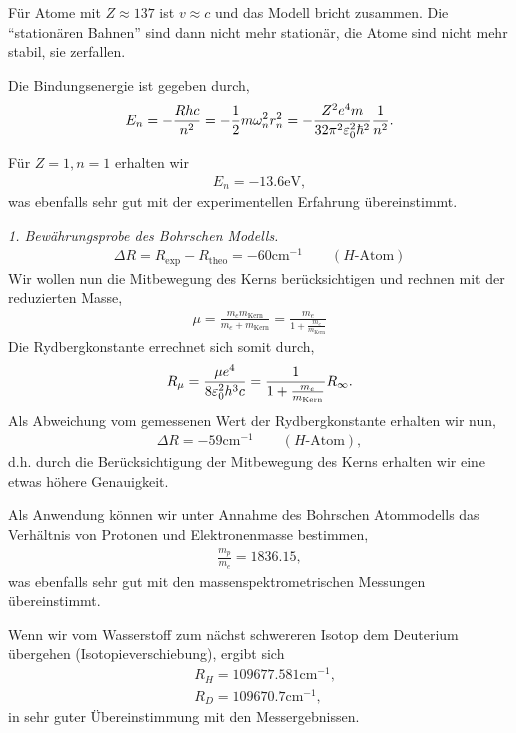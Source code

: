 Für Atome mit $Z\approx 137$ ist $v\approx c$ und das Modell bricht zusammen.
Die ``stationären Bahnen'' sind dann nicht mehr stationär, die Atome sind
nicht mehr stabil, sie zerfallen.

Die Bindungsenergie ist gegeben durch,
\begin{align*}
E_n = -\frac{Rhc}{n^2}= -\frac{1}{2}m\omega_n^2r_n^2 =
-\frac{Z^2e^4m}{32\pi^2\varepsilon_0^2\hbar^2}\frac{1}{n^2}.
\end{align*}

\begin{bspn}
Für $Z=1,n=1$ erhalten wir
\begin{align*}
E_n = -13.6\mathrm{eV},
\end{align*}
was ebenfalls sehr gut mit der experimentellen Erfahrung übereinstimmt.\bsphere
\end{bspn}

\textit{1. Bewährungsprobe des Bohrschen Modells.}
\begin{align*}
\Delta R = R_{\text{exp}}-R_{\text{theo}} = -60\mathrm{cm^{-1}}\qquad
(H\text{-Atom})
\end{align*}
Wir wollen nun die Mitbewegung des Kerns berücksichtigen und rechnen mit der
reduzierten Masse,
\begin{align*}
\mu = \frac{m_em_{\text{Kern}}}{m_e+m_{\text{Kern}}}
= \frac{m_e}{1+\frac{m_e}{m_{\text{Kern}}}}
\end{align*}
Die Rydbergkonstante errechnet sich somit durch,
\begin{align*}
R_\mu = \frac{\mu e^4}{8\varepsilon_0^2 h^3c} =
\frac{1}{1+\frac{m_e}{m_{\text{Kern}}}}R_\infty.
\end{align*}
Als Abweichung vom gemessenen Wert der Rydbergkonstante erhalten wir nun,
\begin{align*}
\Delta R = -59\mathrm{cm^{-1}}\qquad (H\text{-Atom}),
\end{align*}
d.h. durch die Berücksichtigung der Mitbewegung des Kerns erhalten wir eine
etwas höhere Genauigkeit.

Als Anwendung können wir unter Annahme des Bohrschen Atommodells 
das Verhältnis von Protonen und Elektronenmasse bestimmen,
\begin{align*}
\frac{m_p}{m_e} = 1836.15,
\end{align*}
was ebenfalls sehr gut mit den massenspektrometrischen Messungen übereinstimmt.

Wenn wir vom Wasserstoff zum nächst schwereren Isotop dem Deuterium übergehen
(Isotopieverschiebung), ergibt sich
\begin{align*}
&R_H = 109677.581\mathrm{cm^{-1}},\\
&R_D = 109670.7\mathrm{cm^{-1}},
\end{align*}
in sehr guter Übereinstimmung mit den Messergebnissen.

